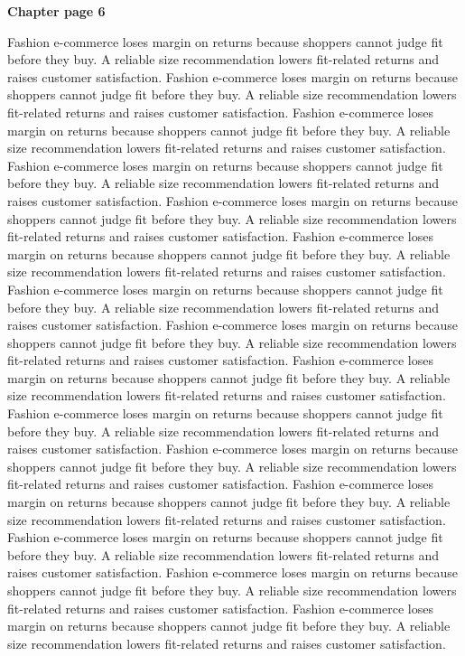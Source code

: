 \documentclass[a4paper,11pt]{article}
\begin{document}
{\headfont\bfseries\Large Chapter page 6}\par\medskip
Fashion e-commerce loses margin on returns because shoppers cannot judge fit before they buy. A reliable size recommendation lowers fit-related returns and raises customer satisfaction. Fashion e-commerce loses margin on returns because shoppers cannot judge fit before they buy. A reliable size recommendation lowers fit-related returns and raises customer satisfaction. Fashion e-commerce loses margin on returns because shoppers cannot judge fit before they buy. A reliable size recommendation lowers fit-related returns and raises customer satisfaction. Fashion e-commerce loses margin on returns because shoppers cannot judge fit before they buy. A reliable size recommendation lowers fit-related returns and raises customer satisfaction. Fashion e-commerce loses margin on returns because shoppers cannot judge fit before they buy. A reliable size recommendation lowers fit-related returns and raises customer satisfaction. 
Fashion e-commerce loses margin on returns because shoppers cannot judge fit before they buy. A reliable size recommendation lowers fit-related returns and raises customer satisfaction. Fashion e-commerce loses margin on returns because shoppers cannot judge fit before they buy. A reliable size recommendation lowers fit-related returns and raises customer satisfaction. Fashion e-commerce loses margin on returns because shoppers cannot judge fit before they buy. A reliable size recommendation lowers fit-related returns and raises customer satisfaction. Fashion e-commerce loses margin on returns because shoppers cannot judge fit before they buy. A reliable size recommendation lowers fit-related returns and raises customer satisfaction. Fashion e-commerce loses margin on returns because shoppers cannot judge fit before they buy. A reliable size recommendation lowers fit-related returns and raises customer satisfaction. 
Fashion e-commerce loses margin on returns because shoppers cannot judge fit before they buy. A reliable size recommendation lowers fit-related returns and raises customer satisfaction. Fashion e-commerce loses margin on returns because shoppers cannot judge fit before they buy. A reliable size recommendation lowers fit-related returns and raises customer satisfaction. Fashion e-commerce loses margin on returns because shoppers cannot judge fit before they buy. A reliable size recommendation lowers fit-related returns and raises customer satisfaction. Fashion e-commerce loses margin on returns because shoppers cannot judge fit before they buy. A reliable size recommendation lowers fit-related returns and raises customer satisfaction. Fashion e-commerce loses margin on returns because shoppers cannot judge fit before they buy. A reliable size recommendation lowers fit-related returns and raises customer satisfaction. \newpage
\end{document}
